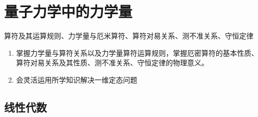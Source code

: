 \documentclass[12pt, a4paper, oneside, UTF8]{ctexbook}
\begin{document}
% 
\else
\fi

\chapter{量子力学中的力学量}
\begin{examct}{}{}
    算符及其运算规则、力学量与厄米算符、算符对易关系、测不准关系、守恒定律
\end{examct}
\begin{examrqm}{}{}
    \begin{enumerate}
        \item 掌握力学量与算符关系以及力学量算符运算规则，掌握厄密算符的基本性质、算符对易关系及其性质、测不准关系、守恒定律的物理意义。
        \item 会灵活运用所学知识解决一维定态问题
    \end{enumerate}
\end{examrqm}

\section{线性代数}

\ifx\allfiles\undefined
\end{document}
